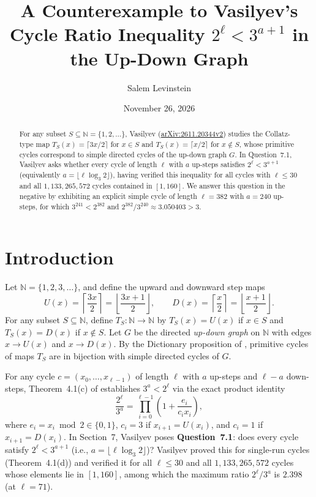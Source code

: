 \documentclass[11pt]{article}
\title{A Counterexample to Vasilyev's Cycle Ratio Inequality $2^\ell < 3^{a+1}$ in the Up-Down Graph}
\author{Salem Levinstein}
\date{November 26, 2026}
\begin{document}
\maketitle

\begin{abstract}
For any subset $S \subseteq \mathbb{N} = \{1,2,\dots\}$, Vasilyev (\href{https://arxiv.org/abs/2611.20344}{arXiv:2611.20344v2}) studies the Collatz-type map $T_S(x) = \lceil 3x/2 \rceil$ for $x \in S$ and $T_S(x) = \lceil x/2 \rceil$ for $x \notin S$, whose primitive cycles correspond to simple directed cycles of the up-down graph $G$. In Question~7.1, Vasilyev asks whether every cycle of length $\ell$ with $a$ up-steps satisfies $2^\ell < 3^{a+1}$ (equivalently $a = \lfloor \ell \log_3 2 \rfloor$), having verified this inequality for all cycles with $\ell \le 30$ and all $1{,}133{,}265{,}572$ cycles contained in $[1,160]$. We answer this question in the negative by exhibiting an explicit simple cycle of length $\ell = 382$ with $a = 240$ up-steps, for which $3^{241} < 2^{382}$ and $2^{382}/3^{240} \approx 3.050403 > 3$.
\end{abstract}

\section{Introduction}
Let $\mathbb{N} = \{1,2,3,\dots\}$, and define the upward and downward step maps
\[
U(x) = \left\lceil \frac{3x}{2} \right\rceil = \left\lfloor \frac{3x+1}{2} \right\rfloor,
\qquad
D(x) = \left\lceil \frac{x}{2} \right\rceil = \left\lfloor \frac{x+1}{2} \right\rfloor.
\]
For any subset $S \subseteq \mathbb{N}$, define $T_S : \mathbb{N} \to \mathbb{N}$ by $T_S(x) = U(x)$ if $x \in S$ and $T_S(x) = D(x)$ if $x \notin S$. Let $G$ be the directed \emph{up-down graph} on $\mathbb{N}$ with edges $x \to U(x)$ and $x \to D(x)$. By the Dictionary proposition of \cite{Vasilyev2026}, primitive cycles of maps $T_S$ are in bijection with simple directed cycles of $G$.

For any cycle $c = (x_0,\dots,x_{\ell-1})$ of length $\ell$ with $a$ up-steps and $\ell - a$ down-steps, Theorem~4.1(c) of \cite{Vasilyev2026} establishes $3^a < 2^\ell$ via the exact product identity
\begin{equation}\label{eq:prod}
\frac{2^\ell}{3^a} = \prod_{i=0}^{\ell-1} \left(1 + \frac{e_i}{c_i x_i}\right),
\end{equation}
where $e_i = x_i \bmod 2 \in \{0,1\}$, $c_i = 3$ if $x_{i+1}=U(x_i)$, and $c_i = 1$ if $x_{i+1}=D(x_i)$. In Section~7, Vasilyev poses \textbf{Question~7.1}: does every cycle satisfy $2^\ell < 3^{a+1}$ (i.e., $a = \lfloor \ell \log_3 2 \rfloor$)? Vasilyev proved this for single-run cycles (Theorem~4.1(d)) and verified it for all $\ell \le 30$ and all $1{,}133{,}265{,}572$ cycles whose elements lie in $[1,160]$, among which the maximum ratio $2^\ell/3^a$ is $2.398$ (at $\ell = 71$).
\end{document}
